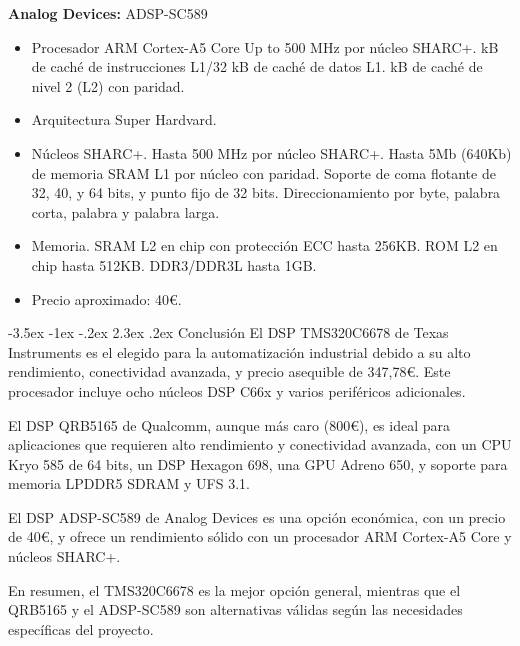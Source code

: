 \documentclass[11pt]{report}
\makeatletter
\renewcommand\chapter{\@startsection{chapter}{0}{\z@}%
    {-3.5ex \@plus -1ex \@minus -.2ex}%
    {2.3ex \@plus.2ex}%
    {\normalfont\Large\bfseries}}
\makeatother
\begin{document}
\textbf{Analog Devices:} ADSP-SC589
\begin{itemize}
      \item Procesador ARM Cortex-A5 Core
            \subitem Up to 500 MHz por núcleo SHARC+.
             kB de caché de instrucciones L1/32 kB de caché de datos L1.
             kB de caché de nivel 2 (L2) con paridad.
      \item Arquitectura Super Hardvard.
      \item Núcleos SHARC+.
            \subitem Hasta 500 MHz por núcleo SHARC+.
            \subitem Hasta 5Mb (640Kb) de memoria SRAM L1 por núcleo con paridad.
            \subitem Soporte de coma flotante de 32, 40, y 64 bits, y punto fijo de 32 bits.
            \subitem Direccionamiento por byte, palabra corta, palabra y palabra larga.
      \item Memoria.
            \subitem SRAM L2 en chip con protección ECC hasta 256KB.
            \subitem ROM L2 en chip hasta 512KB.
            \subitem DDR3/DDR3L hasta 1GB.
      \item Precio aproximado: 40\euro.
\end{itemize}

\newpage

\chapter{Conclusión}
El DSP TMS320C6678 de Texas Instruments es el elegido para la automatización industrial 
debido a su alto rendimiento, conectividad avanzada, y precio asequible de 347,78\euro. 
Este procesador incluye ocho núcleos DSP C66x y varios periféricos adicionales.

El DSP QRB5165 de Qualcomm, aunque más caro (800\euro), es ideal para aplicaciones que 
requieren alto rendimiento y conectividad avanzada, con un CPU Kryo 585 de 64 bits, 
un DSP Hexagon 698, una GPU Adreno 650, y soporte para memoria LPDDR5 SDRAM y UFS 3.1.

El DSP ADSP-SC589 de Analog Devices es una opción económica, con un precio de 40\euro, 
y ofrece un rendimiento sólido con un procesador ARM Cortex-A5 Core y núcleos SHARC+.

En resumen, el TMS320C6678 es la mejor opción general, mientras que el QRB5165 y el 
ADSP-SC589 son alternativas válidas según las necesidades específicas del proyecto.

\newpage
\end{document}
